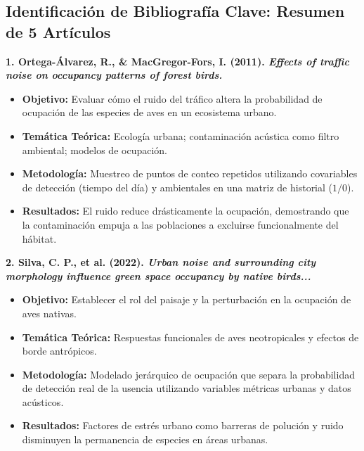 \documentclass[12pt]{article}
\begin{document}
\subsection*{Identificación de Bibliografía Clave: Resumen de 5 Artículos}

\textbf{1. Ortega-Álvarez, R., \& MacGregor-Fors, I. (2011). \textit{Effects of traffic noise on occupancy patterns of forest birds.}}
\begin{itemize}[leftmargin=0.5cm]
    \item \textbf{Objetivo:} Evaluar cómo el ruido del tráfico altera la probabilidad de ocupación de las especies de aves en un ecosistema urbano.
    \item \textbf{Temática Teórica:} Ecología urbana; contaminación acústica como filtro ambiental; modelos de ocupación.
    \item \textbf{Metodología:} Muestreo de puntos de conteo repetidos utilizando covariables de detección (tiempo del día) y ambientales en una matriz de historial ($1/0$).
    \item \textbf{Resultados:} El ruido reduce drásticamente la ocupación, demostrando que la contaminación empuja a las poblaciones a excluirse funcionalmente del hábitat.
\end{itemize}

\textbf{2. Silva, C. P., et al. (2022). \textit{Urban noise and surrounding city morphology influence green space occupancy by native birds...}}
\begin{itemize}[leftmargin=0.5cm]
    \item \textbf{Objetivo:} Establecer el rol del paisaje y la perturbación en la ocupación de aves nativas.
    \item \textbf{Temática Teórica:} Respuestas funcionales de aves neotropicales y efectos de borde antrópicos.
    \item \textbf{Metodología:} Modelado jerárquico de ocupación que separa la probabilidad de detección real de la usencia utilizando variables métricas urbanas y datos acústicos.
    \item \textbf{Resultados:} Factores de estrés urbano como barreras de polución y ruido disminuyen la permanencia de especies en áreas urbanas.
\end{itemize}
\end{document}
